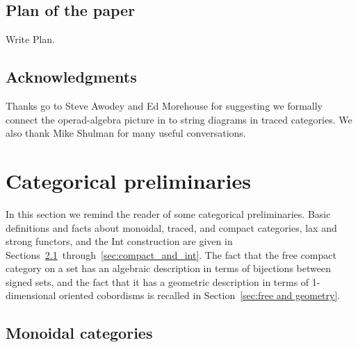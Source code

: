 \documentclass[12pt,oneside,article,draft]{memoir}
\begin{document}
\section{Plan of the paper} 

Write Plan.

\section*{Acknowledgments}

Thanks go to Steve Awodey and Ed Morehouse for suggesting we formally connect the operad-algebra
picture in \cite{RupelSpivak} to string diagrams in traced categories. We also thank Mike Shulman for many useful conversations.

\chapter{Categorical preliminaries}\label{sec:traced categories}

In this section we remind the reader of some categorical preliminaries. Basic definitions and facts
about monoidal, traced, and compact categories, lax and strong functors, and the Int construction
are given in Sections~\ref{sec:prelim_monoidal}~through~\ref{sec:compact_and_int}. The fact that
the free compact category on a set has an algebraic description in terms of bijections between
signed sets, and the fact that it has a geometric description in terms of 1-dimensional oriented
cobordisms is recalled in Section~\ref{sec:free and geometry}. 

\section{Monoidal categories}\label{sec:prelim_monoidal}
\end{document}
